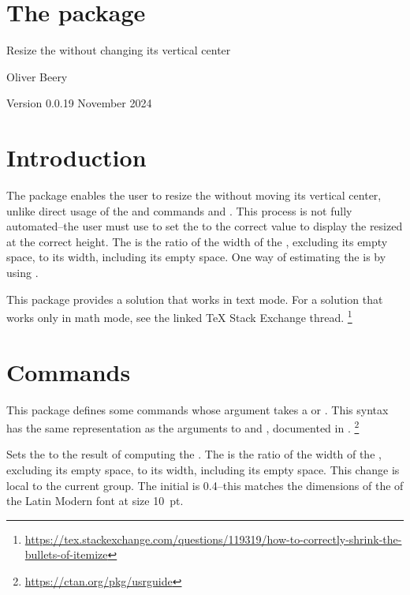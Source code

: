 \documentclass{beery}
\begin{document}
\section*
  {%
    The  package%
  }

Resize the  without changing its vertical center

Oliver Beery

Version 0.0.1\quad{}9 November 2024


\section{Introduction}
\label{sec:intro}

The  package enables the user to resize the  without moving its vertical center, unlike direct usage of the \LaTeXe{} and  commands  and .
This process is not fully automated\---the user must use  to set the \textbulletfactor{} to the correct value to display the resized  at the correct height.
The \textbulletfactor{} is the ratio of the width of the , excluding its empty space, to its width, including its empty space.
One way of estimating the \textbulletfactor{} is by using .

This package provides a solution that works in text mode.
For a solution that works only in math mode, see the linked \TeX{} Stack Exchange thread.%
\footnote{\url{https://tex.stackexchange.com/questions/119319/how-to-correctly-shrink-the-bullets-of-itemize}}


\section{Commands}
\label{sec:commands}

This package defines some commands whose argument takes a  or .
This syntax has the same representation as the arguments to  and , documented in .%
\footnote{\url{https://ctan.org/pkg/usrguide}}

 
\KeepNextPar*

Sets the \textbulletfactor{} to the result of computing the .
The \textbulletfactor{} is the ratio of the width of the , excluding its empty space, to its width, including its empty space.
This change is local to the current group.
The initial \textbulletfactor{} is \num{0.4}\---this matches the dimensions of the  of the Latin Modern font at size \qty{10}{pt}.
\end{document}

